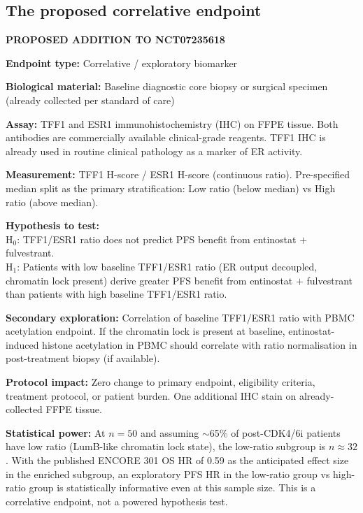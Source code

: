 \documentclass[12pt, a4paper]{article}
\begin{document}
\subsection{The proposed correlative endpoint}

\begin{center}
\colorbox{actionbox}{
\begin{minipage}{0.85\textwidth}
\vspace{0.5em}
\textbf{PROPOSED ADDITION TO NCT07235618}

\medskip
\textbf{Endpoint type:} Correlative / exploratory
biomarker

\medskip
\textbf{Biological material:} Baseline diagnostic
core biopsy or surgical specimen (already collected
per standard of care)

\medskip
\textbf{Assay:} TFF1 and ESR1 immunohistochemistry
(IHC) on FFPE tissue. Both antibodies are
commercially available clinical-grade reagents.
TFF1 IHC is already used in routine clinical
pathology as a marker of ER activity.

\medskip
\textbf{Measurement:} TFF1 H-score / ESR1 H-score
(continuous ratio). Pre-specified median split as
the primary stratification: Low ratio (below median)
vs High ratio (above median).

\medskip
\textbf{Hypothesis to test:}\\
H$_0$: TFF1/ESR1 ratio does not predict PFS benefit
from entinostat $+$ fulvestrant.\\
H$_1$: Patients with low baseline TFF1/ESR1 ratio
(ER output decoupled, chromatin lock present) derive
greater PFS benefit from entinostat $+$ fulvestrant
than patients with high baseline TFF1/ESR1 ratio.

\medskip
\textbf{Secondary exploration:}
Correlation of baseline TFF1/ESR1 ratio with PBMC
acetylation endpoint. If the chromatin lock is
present at baseline, entinostat-induced histone
acetylation in PBMC should correlate with ratio
normalisation in post-treatment biopsy (if available).

\medskip
\textbf{Protocol impact:} Zero change to primary
endpoint, eligibility criteria, treatment protocol,
or patient burden. One additional IHC stain on
already-collected FFPE tissue.

\medskip
\textbf{Statistical power:} At $n=50$ and assuming
$\sim$65\% of post-CDK4/6i patients have low ratio
(LumB-like chromatin lock state), the low-ratio
subgroup is $n\approx32$. With the published ENCORE
301 OS HR of 0.59 as the anticipated effect size in
the enriched subgroup, an exploratory PFS HR in the
low-ratio group vs high-ratio group is statistically
informative even at this sample size. This is a
correlative endpoint, not a powered hypothesis test.
\vspace{0.4em}
\end{minipage}
}
\end{center}
\end{document}
